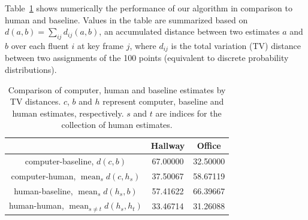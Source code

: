 \documentclass[10pt,journal,letterpaper,compsoc]{IEEEtran}
\begin{document}
Table~\ref{tab:comparison} shows numerically the performance of our algorithm in comparison to human and baseline. Values in the table are summarized based on $d(a,b)=\sum_{ij} d_{ij}(a,b)$, an accumulated distance between two estimates $a$ and $b$ over each fluent $i$ at key frame $j$, where $d_{ij}$ is the total variation (TV) distance between two assignments of the 100 points (equivalent to discrete probability distributions).


\begin{table}[htp]
\centering
\caption{Comparison of computer, human and baseline estimates by TV distances. $c$, $b$ and $h$ represent computer, baseline and human estimates, respectively. $s$ and $t$ are indices for the collection of human estimates.\label{tab:comparison}}
\begin{tabular}{c|cc}
\toprule
 & Hallway & Office \\
\midrule
 computer-baseline, $d(c,b)$ &  67.00000 & 32.50000 \\
 computer-human,  $\operatorname{mean}_s d(c,h_s)$ & 37.50067 & 58.67119  \\
 human-baseline, $\operatorname{mean}_s d(h_s,b)$ & 57.41622 & 66.39667 \\
 human-human, $\operatorname{mean}_{s\neq t} d(h_s,h_t)$ & 33.46714 & 31.26088 \\
\bottomrule
\end{tabular}
\end{table}


\end{document}
